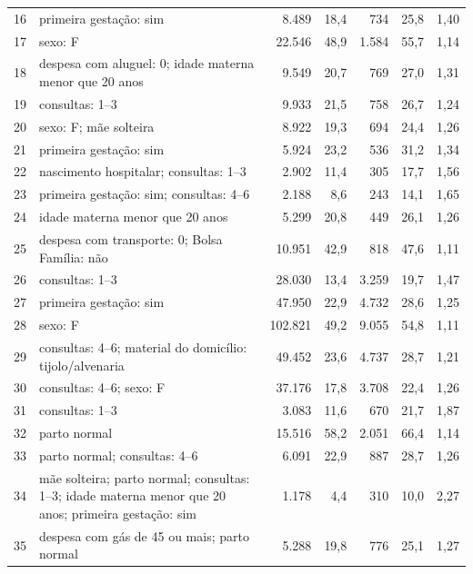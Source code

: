 \begin{table}[H]
\begin{tabularx}{\textwidth}{@{}c Y r r r r r@{}}
16 & primeira gestação: sim & 8.489 & 18,4 & 734 & 25,8 & 1,40 \\
17 & sexo: F & 22.546 & 48,9 & 1.584 & 55,7 & 1,14 \\
18 & despesa com aluguel: 0; idade materna menor que 20 anos & 9.549 & 20,7 & 769 & 27,0 & 1,31 \\
19 & consultas: 1--3 & 9.933 & 21,5 & 758 & 26,7 & 1,24 \\
20 & sexo: F; mãe solteira & 8.922 & 19,3 & 694 & 24,4 & 1,26 \\

21 & primeira gestação: sim & 5.924 & 23,2 & 536 & 31,2 & 1,34 \\
22 & nascimento hospitalar; consultas: 1--3 & 2.902 & 11,4 & 305 & 17,7 & 1,56 \\
23 & primeira gestação: sim; consultas: 4--6 & 2.188 & 8,6 & 243 & 14,1 & 1,65 \\
24 & idade materna menor que 20 anos & 5.299 & 20,8 & 449 & 26,1 & 1,26 \\
25 & despesa com transporte: 0; Bolsa Família: não & 10.951 & 42,9 & 818 & 47,6 & 1,11 \\

26 & consultas: 1--3 & 28.030 & 13,4 & 3.259 & 19,7 & 1,47 \\
27 & primeira gestação: sim & 47.950 & 22,9 & 4.732 & 28,6 & 1,25 \\
28 & sexo: F & 102.821 & 49,2 & 9.055 & 54,8 & 1,11 \\
29 & consultas: 4--6; material do domicílio: tijolo/alvenaria & 49.452 & 23,6 & 4.737 & 28,7 & 1,21 \\
30 & consultas: 4--6; sexo: F & 37.176 & 17,8 & 3.708 & 22,4 & 1,26 \\

31 & consultas: 1--3 & 3.083 & 11,6 & 670 & 21,7 & 1,87 \\
32 & parto normal & 15.516 & 58,2 & 2.051 & 66,4 & 1,14 \\
33 & parto normal; consultas: 4--6 & 6.091 & 22,9 & 887 & 28,7 & 1,26 \\
34 & mãe solteira; parto normal; consultas: 1--3; idade materna menor que 20 anos; primeira gestação: sim & 1.178 & 4,4 & 310 & 10,0 & 2,27 \\
35 & despesa com gás de 45 ou mais; parto normal & 5.288 & 19,8 & 776 & 25,1 & 1,27 \\


\end{tabularx}
\end{table}
